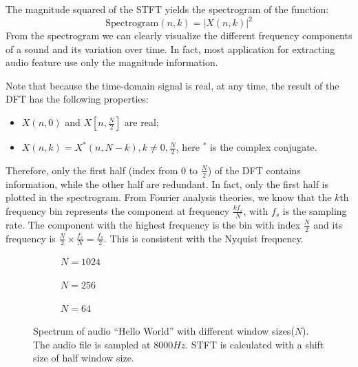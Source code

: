\documentclass[11pt,a4paper]{report}
\begin{document}
The magnitude squared of the STFT yields the spectrogram of the function:
\[ \text{Spectrogram}(n, k) = \left|X(n,k)\right|^2 \]
From the spectrogram we can clearly visualize the different frequency components of a sound and its variation over time. In fact, most application for extracting audio feature use only the magnitude information.

Note that because the time-domain signal is real, at any time, the result of the DFT has the following properties:
\begin{itemize}
  \item $X(n,0)$ and $X[n, \frac{N}{2}]$ are real;
  \item $X(n,k) = X^*(n,N-k), k \neq 0, \frac{N}{2}$, here $^*$ is the complex conjugate.
\end{itemize}
Therefore, only the first half (index from $0$ to $\frac{N}{2}$) of the DFT contains information, while the other half are redundant. In fact, only the first half is plotted in the spectrogram. From Fourier analysis theories, we know that the $k$th frequency bin represents the component at frequency $\frac{kf_s}{N}$, with $f_s$ is the sampling rate. The component with the highest frequency is the bin with index $\frac{N}{2}$ and its frequency is $\frac{N}{2} \times \frac{f_s}{N} = \frac{f_s}{2}$. This is consistent with the Nyquist frequency.

\begin{figure}[thbp]
  \centering
  \begin{subfigure}[b]{.8\textwidth}
    
    \caption{$N=1024$}
    \label{fig:spec1024}
  \end{subfigure}

  \begin{subfigure}[b]{.8\textwidth}
    
    \caption{$N=256$}
    \label{fig:spec256}
  \end{subfigure}

  \begin{subfigure}[b]{.8\textwidth}
    
    \caption{$N=64$}
    \label{fig:spec64}
  \end{subfigure}

  \caption{Spectrum of audio ``Hello World'' with different window sizes($N$). The audio file is sampled at $8000Hz$. STFT is calculated with a shift size of half window size.}
  \label{fig:spec}
\end{figure}
\end{document}
